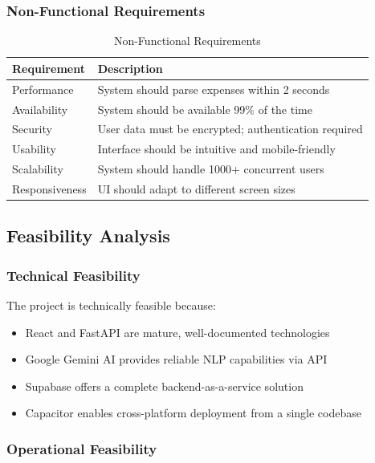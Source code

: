 \subsubsection{Non-Functional Requirements}

\begin{table}[H]
\centering
\caption{Non-Functional Requirements}
\label{tab:nfr}
\begin{tabular}{|p{3cm}|p{10cm}|}
\hline
\textbf{Requirement} & \textbf{Description} \\
\hline
Performance & System should parse expenses within 2 seconds \\
\hline
Availability & System should be available 99\% of the time \\
\hline
Security & User data must be encrypted; authentication required \\
\hline
Usability & Interface should be intuitive and mobile-friendly \\
\hline
Scalability & System should handle 1000+ concurrent users \\
\hline
Responsiveness & UI should adapt to different screen sizes \\
\hline
\end{tabular}
\end{table}

\subsection{Feasibility Analysis}

\subsubsection{Technical Feasibility}

The project is technically feasible because:
\begin{itemize}
    \item React and FastAPI are mature, well-documented technologies
    \item Google Gemini AI provides reliable NLP capabilities via API
    \item Supabase offers a complete backend-as-a-service solution
    \item Capacitor enables cross-platform deployment from a single codebase
\end{itemize}

\subsubsection{Operational Feasibility}


